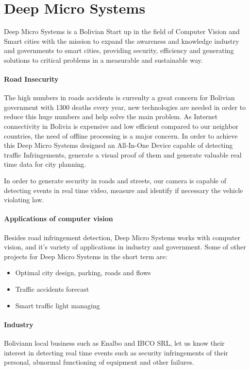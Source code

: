 \documentclass[fleqn,12pt]{SelfArx} %
\begin{document}
\section{Deep Micro Systems}

Deep Micro Systems is a Bolivian Start up in the field of Computer Vision and Smart cities with the mission to  expand the awareness and knowledge industry and governments to smart cities, providing security, efficiency and generating solutions to critical problems in a measurable and sustainable way.

\paragraph{Road Insecurity} The high numbers in roads accidents is currenlty a great concern for Bolivian government with 1300 deaths every year, new technologies are needed in order to reduce this huge numbers and help solve the main problem. As Internet connectivity in Bolivia is expensive and low efficient compared to our neighbor countries, the need of offline processing is a major concern. In order to achieve this Deep Micro Systems designed an All-In-One Device capable of detecting traffic Infringements, generate a visual proof of them and generate valuable real time data for city planning.

In order to generate security in roads and streets, our camera is capable of detecting events in real time video, measure and identify if necessary the vehicle violating law.

\paragraph{Applications of computer vision} Besides road infringement detection, Deep Micro Systems works with computer vision, and it's variety of applications in industry and government. Some of other projects for Deep Micro Systems in the short term are:

\begin{itemize}[noitemsep] %
\item Optimal city design, parking, roads and flows
\item Traffic accidents forecast
\item Smart traffic light managing
\end{itemize}

\paragraph{Industry} Boliviann local business such as Enalbo and IBCO SRL, let us know their interest in detecting real time events such as security infringements of their personal, abnormal functioning of equipment and other failures.
\end{document}
